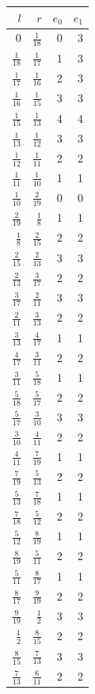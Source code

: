 \documentclass[11pt]{article}
\begin{document}
\begin{longtable}{rrrr}
\toprule $l$&$r$&$e_0$&$e_1$\\\midrule\endhead
$0$&$\frac{1}{18}$&0&3\\
$\frac{1}{18}$&$\frac{1}{17}$&1&3\\
$\frac{1}{17}$&$\frac{1}{16}$&2&3\\
$\frac{1}{16}$&$\frac{1}{15}$&3&3\\
$\frac{1}{15}$&$\frac{1}{13}$&4&4\\
$\frac{1}{13}$&$\frac{1}{12}$&3&3\\
$\frac{1}{12}$&$\frac{1}{11}$&2&2\\
$\frac{1}{11}$&$\frac{1}{10}$&1&1\\
$\frac{1}{10}$&$\frac{2}{19}$&0&0\\
$\frac{2}{19}$&$\frac{1}{8}$&1&1\\
$\frac{1}{8}$&$\frac{2}{15}$&2&2\\
$\frac{2}{15}$&$\frac{2}{13}$&3&3\\
$\frac{2}{13}$&$\frac{3}{17}$&2&2\\
$\frac{3}{17}$&$\frac{2}{11}$&3&3\\
$\frac{2}{11}$&$\frac{3}{13}$&2&2\\
$\frac{3}{13}$&$\frac{4}{17}$&1&1\\
$\frac{4}{17}$&$\frac{3}{11}$&2&2\\
$\frac{3}{11}$&$\frac{5}{18}$&1&1\\
$\frac{5}{18}$&$\frac{5}{17}$&2&2\\
$\frac{5}{17}$&$\frac{3}{10}$&3&3\\
$\frac{3}{10}$&$\frac{4}{11}$&2&2\\
$\frac{4}{11}$&$\frac{7}{19}$&1&1\\
$\frac{7}{19}$&$\frac{5}{13}$&2&2\\
$\frac{5}{13}$&$\frac{7}{18}$&1&1\\
$\frac{7}{18}$&$\frac{5}{12}$&2&2\\
$\frac{5}{12}$&$\frac{8}{19}$&1&1\\
$\frac{8}{19}$&$\frac{5}{11}$&2&2\\
$\frac{5}{11}$&$\frac{8}{17}$&1&1\\
$\frac{8}{17}$&$\frac{9}{19}$&2&2\\
$\frac{9}{19}$&$\frac{1}{2}$&3&3\\
$\frac{1}{2}$&$\frac{8}{15}$&2&2\\
$\frac{8}{15}$&$\frac{7}{13}$&3&3\\
$\frac{7}{13}$&$\frac{6}{11}$&2&2\\

\end{longtable}
\end{document}
